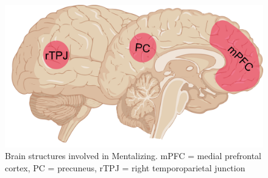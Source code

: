 \begin{figure}[!ht]
	\centering
	\includegraphics[width=.6\textwidth, clip=true]{./Chapters/01_Introduction/Images/Mentalizing_network}
	\caption{Brain structures involved in Mentalizing. mPFC = medial prefrontal cortex, PC = precuneus, rTPJ = right temporoparietal junction}
    \vspace*{-10pt}
	\label{fig:mentalizing}
\end{figure}